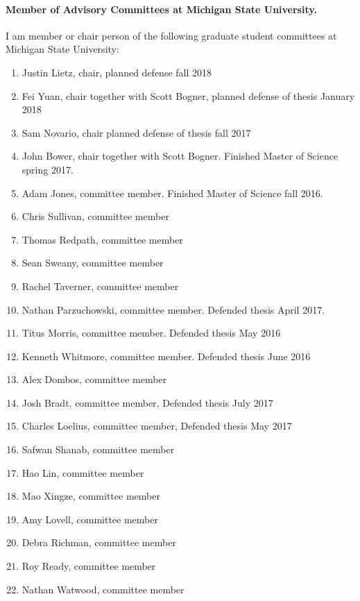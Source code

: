 \documentclass[a4wide,10pt]{article}
\begin{document}
\paragraph{Member of Advisory Committees at Michigan State University.}
I am member or chair person of the following graduate  student committees at Michigan State University:
\begin{enumerate}
\item Justin Lietz, chair, planned defense fall 2018

\item Fei Yuan, chair together with Scott Bogner, planned defense of thesis January 2018

\item Sam Novario, chair planned defense of thesis fall 2017

\item John Bower, chair together with Scott Bogner. Finished Master of Science spring 2017.  

\item Adam Jones, committee member. Finished Master of Science fall 2016.

\item Chris Sullivan, committee member

\item Thomas Redpath, committee member

\item Sean Sweany, committee member

\item Rachel Taverner, committee member

\item Nathan Parzuchowski, committee member. Defended thesis April 2017.

\item Titus Morris, committee member. Defended thesis May 2016

\item Kenneth Whitmore, committee member. Defended thesis June 2016

\item Alex Dombos, committee member

\item Josh Bradt, committee member, Defended thesis July 2017

\item Charles Loelius, committee member, Defended thesis May 2017

\item Safwan Shanab, committee member

\item Hao Lin, committee member

\item Mao Xingze, committee member

\item Amy Lovell, committee member

\item Debra Richman, committee member

\item Roy Ready, committee member

\item Nathan Watwood, committee member 
\end{enumerate}
\end{document}
